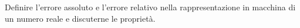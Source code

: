 Definire l'errore assoluto e l'errore relativo nella 
rappresentazione in macchina di un numero reale e discuterne le 
propriet\`{a}.
